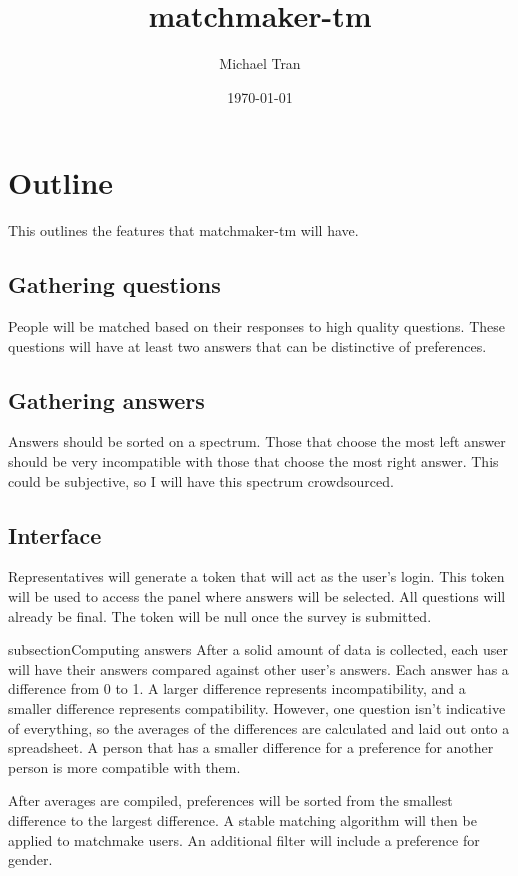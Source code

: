 \documentclass[12pt]{article}
\title{matchmaker-tm}
\author{Michael Tran}
\date{\today}
\begin{document}
\maketitle

\section{Outline}
This outlines the features that matchmaker-tm will have.

\subsection{Gathering questions}
People will be matched based on their responses to high quality questions. These
questions will have at least two answers that can be distinctive of
preferences.

\subsection{Gathering answers}
Answers should be sorted on a spectrum. Those that choose the most left answer
should be very incompatible with those that choose the most right answer. This
could be subjective, so I will have this spectrum crowdsourced.

\subsection{Interface}
Representatives will generate a token that will act as the user's login. This
token will be used to access the panel where answers will be selected. All
questions will already be final. The token will be null once the survey is
submitted.

subsection{Computing answers}
After a solid amount of data is collected, each user will have their answers
compared against other user's answers. Each answer has a difference from 0 to 1.
A larger difference represents incompatibility, and a smaller difference
represents compatibility. However, one question isn't indicative of everything,
so the averages of the differences are calculated and laid out onto a
spreadsheet. A person that has a smaller difference for a preference for another 
person is more compatible with them.

After averages are compiled, preferences will be sorted from the smallest
difference to the largest difference. A stable matching algorithm will then be
applied to matchmake users. An additional filter will include a preference for
gender.
\end{document}

